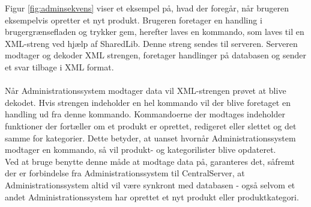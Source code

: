 Figur \ref{fig:adminsekvens} viser et eksempel på, hvad der foregår, når brugeren eksempelvis opretter et nyt produkt. Brugeren foretager en handling i brugergrænsefladen og trykker gem, herefter laves en kommando, som laves til en XML-streng ved hjælp af SharedLib. Denne streng sendes til serveren. Serveren modtager og dekoder XML strengen, foretager handlinger på databasen og sender et svar tilbage i XML format.\\\\
Når Administrationssystem modtager data vil XML-strengen prøvet at blive dekodet. Hvis strengen indeholder en hel kommando vil der blive foretaget en handling ud fra denne kommando. Kommandoerne der modtages indeholder funktioner der fortæller om et produkt er oprettet, redigeret eller slettet og det samme for kategorier. Dette betyder, at uanset hvornår Administrationssystem modtager en kommando, så vil produkt- og kategorilister blive opdateret.\\
Ved at bruge benytte denne måde at modtage data på, garanteres det, såfremt der er forbindelse fra Administrationssystem til CentralServer, at Administrationssystem altid vil være synkront med databasen - også selvom et andet Administrationssystem har oprettet et nyt produkt eller produktkategori.
